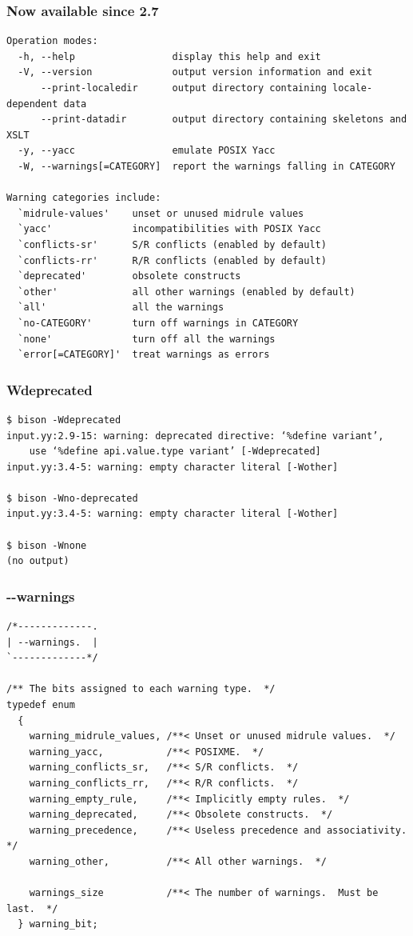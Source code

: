 \documentclass{beamer}
\begin{document}
\begin{frame}[fragile,shrink=25]
  \frametitle{Now available since 2.7}
  \begin{verbatim}
Operation modes:
  -h, --help                 display this help and exit
  -V, --version              output version information and exit
      --print-localedir      output directory containing locale-dependent data
      --print-datadir        output directory containing skeletons and XSLT
  -y, --yacc                 emulate POSIX Yacc
  -W, --warnings[=CATEGORY]  report the warnings falling in CATEGORY

Warning categories include:
  `midrule-values'    unset or unused midrule values
  `yacc'              incompatibilities with POSIX Yacc
  `conflicts-sr'      S/R conflicts (enabled by default)
  `conflicts-rr'      R/R conflicts (enabled by default)
  `deprecated'        obsolete constructs
  `other'             all other warnings (enabled by default)
  `all'               all the warnings
  `no-CATEGORY'       turn off warnings in CATEGORY
  `none'              turn off all the warnings
  `error[=CATEGORY]'  treat warnings as errors
  \end{verbatim}
\end{frame}

\begin{frame}[fragile,shrink=25]
  \frametitle{Wdeprecated}
  \begin{verbatim}
$ bison -Wdeprecated
input.yy:2.9-15: warning: deprecated directive: ‘%define variant’,
    use ‘%define api.value.type variant’ [-Wdeprecated]
input.yy:3.4-5: warning: empty character literal [-Wother]

$ bison -Wno-deprecated
input.yy:3.4-5: warning: empty character literal [-Wother]

$ bison -Wnone
(no output)
  \end{verbatim}
\end{frame}

\begin{frame}[fragile,shrink=25]
  \frametitle{-{}-warnings}
\begin{verbatim}
/*-------------.
| --warnings.  |
`-------------*/

/** The bits assigned to each warning type.  */
typedef enum
  {
    warning_midrule_values, /**< Unset or unused midrule values.  */
    warning_yacc,           /**< POSIXME.  */
    warning_conflicts_sr,   /**< S/R conflicts.  */
    warning_conflicts_rr,   /**< R/R conflicts.  */
    warning_empty_rule,     /**< Implicitly empty rules.  */
    warning_deprecated,     /**< Obsolete constructs.  */
    warning_precedence,     /**< Useless precedence and associativity.  */
    warning_other,          /**< All other warnings.  */

    warnings_size           /**< The number of warnings.  Must be last.  */
  } warning_bit;
\end{verbatim}
\end{frame}
\end{document}
